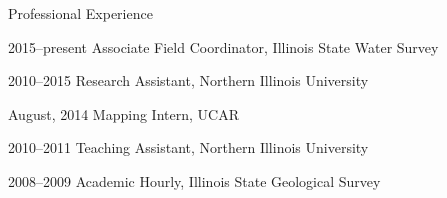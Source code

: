 \begin{cvlist}{Professional Experience}

        \item[2015--present] Associate Field Coordinator, Illinois State Water Survey
        \item[2010--2015] Research Assistant, Northern Illinois University
        \item[August, 2014] Mapping Intern, UCAR
        \item[2010--2011] Teaching Assistant, Northern Illinois University
        \item[2008--2009] Academic Hourly, Illinois State Geological Survey
\end{cvlist}
